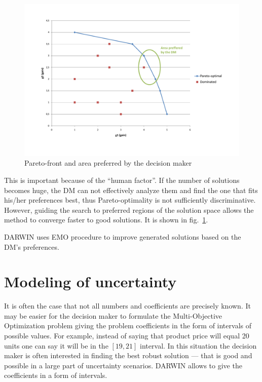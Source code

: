 \begin{figure}
  \centering \includegraphics[width=1.2\textwidth]{img/pareto}
  \caption{Pareto-front and area preferred by the decision maker}
  \label{pareto}
\end{figure}

This is important because of the ``human factor''. If the number of solutions
becomes huge, the DM can not effectively analyze them and find the one that
fits his/her preferences best, thus Pareto-optimality is not sufficiently
discriminative. However, guiding the search to preferred regions of the
solution space allows the method to converge faster to good solutions. It is
shown in fig.~\ref{pareto}.

DARWIN uses EMO procedure to improve generated solutions based on the DM's
preferences.


\section{Modeling of uncertainty}
\label{uncert-mod}

It is often the case that not all numbers and coefficients are precisely
known. It may be easier for the decision maker to formulate the
Multi-Objective Optimization problem giving the problem coefficients in the
form of intervals of possible values. For example, instead of saying that
product price will equal 20 units one can say it will be in the $[19, 21]$
interval. In this situation the decision maker is often interested in finding
the best robust solution --- that is good and possible in a large part of
uncertainty scenarios. DARWIN allows to give the coefficients in a form of
intervals.

